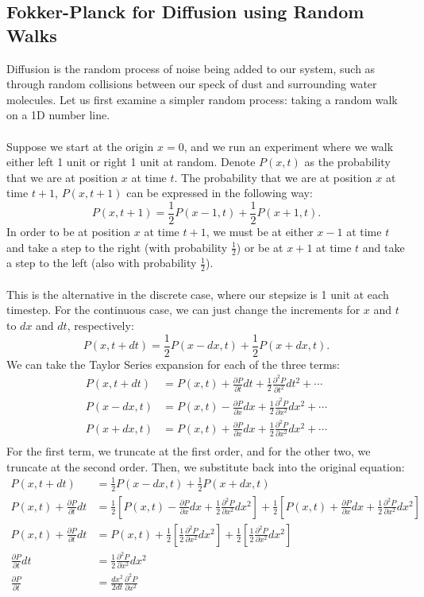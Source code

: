 \documentclass{article}
\begin{document}
\subsection{Fokker-Planck for Diffusion using Random Walks}
Diffusion is the random process of noise being added to our system, such as through random collisions between our speck of dust and surrounding water molecules. Let us first examine a simpler random process: taking a random walk on a 1D number line. 
\\
\\
Suppose we start at the origin $x=0$, and we run an experiment where we walk either left 1 unit or right 1 unit at random. Denote $P(x,t)$ as the probability that we are at position $x$ at time $t$. The probability that we are at position $x$ at time $t+1$, $P(x,t+1)$ can be expressed in the following way:
\[P(x,t+1)=\frac{1}{2}P(x-1,t)+\frac{1}{2}P(x+1,t).\]
In order to be at position $x$ at time $t+1$, we must be at either $x-1$ at time $t$ and take a step to the right (with probability $\frac{1}{2}$) or be at $x+1$ at time $t$ and take a step to the left (also with probability $\frac{1}{2}$). 
\\
\\
This is the alternative in the discrete case, where our stepsize is 1 unit at each timestep. For the continuous case, we can just change the increments for $x$ and $t$ to $dx$ and $dt$, respectively:
\[P(x,t+dt)=\frac{1}{2}P(x-dx,t)+\frac{1}{2}P(x+dx,t).\]
We can take the Taylor Series expansion for each of the three terms:
\begin{align*}
    P(x,t+dt)&=P(x,t)+\frac{\partial P}{\partial t} dt + \frac{1}{2}\frac{\partial ^2 P}{\partial t^2} dt^2 + \cdots\\
    P(x-dx,t)&=P(x,t)-\frac{\partial P}{\partial x} dx + \frac{1}{2}\frac{\partial ^2 P}{\partial x^2} dx^2 + \cdots\\
    P(x+dx,t)&=P(x,t)+\frac{\partial P}{\partial x} dx + \frac{1}{2}\frac{\partial ^2 P}{\partial x^2} dx^2 + \cdots\\
\end{align*}
For the first term, we truncate at the first order, and for the other two, we truncate at the second order. Then, we substitute back into the original equation:
\begin{align*}
    P(x,t+dt)&=\frac{1}{2}P(x-dx,t)+\frac{1}{2}P(x+dx,t)\\
    P(x,t)+\frac{\partial P}{\partial t} dt&=\frac{1}{2}\left[P(x,t)-\frac{\partial P}{\partial x} dx + \frac{1}{2}\frac{\partial ^2 P}{\partial x^2} dx^2\right] + \frac{1}{2}\left[P(x,t)+\frac{\partial P}{\partial x} dx + \frac{1}{2}\frac{\partial ^2 P}{\partial x^2} dx^2\right]\\
    P(x,t)+\frac{\partial P}{\partial t} dt&=P(x,t)+\frac{1}{2}\left[\frac{1}{2}\frac{\partial ^2 P}{\partial x^2} dx^2\right] + \frac{1}{2}\left[\frac{1}{2}\frac{\partial ^2 P}{\partial x^2} dx^2\right]\\
    \frac{\partial P}{\partial t} dt&=\frac{1}{2}\frac{\partial ^2 P}{\partial x^2} dx^2\\
    \frac{\partial P}{\partial t}&=\frac{dx^2}{2dt}\frac{\partial ^2 P}{\partial x^2}\\
\end{align*}
\end{document}
